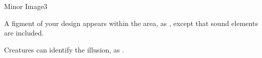 \begin{spellsection}{Minor Image}{3}
\begin{spellheader}
\end{spellheader}
\begin{spellcontent}
    \begin{spelltargetinginfo}
    \end{spelltargetinginfo}
    \begin{spelleffects}
        \spelleffect A figment of your design appears within the area, as , except that sound elements are included.
        \spelldur \durshort
    \end{spelleffects}
\end{spellcontent}
\begin{spellfooter}
    \spellnotes Creatures can identify the illusion, as .
\end{spellfooter}
\end{spellsection}

